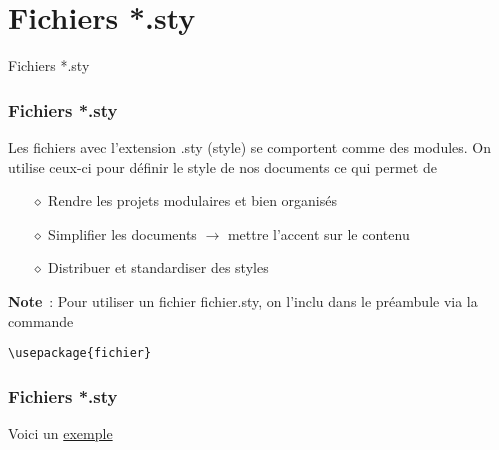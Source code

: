 
\section{Fichiers *.sty}

\begin{frame}
    \vfill
    \begin{center}
        \large
        Fichiers *.sty
    \end{center}
    \vfill
\end{frame}

\begin{frame}[fragile]
    \frametitle{Fichiers *.sty}
    Les fichiers avec l'extension \textcolor{vibrant_green}{.sty (style)} se comportent comme des modules.
    On utilise ceux-ci pour définir le style de nos documents ce qui permet de
    \vspace{0.3cm}
    \pause
    \begin{itemize}
        \item[$\diamond$] Rendre les projets modulaires et bien organisés
        \pause
        \item[$\diamond$] Simplifier les documents $\to$ mettre l'accent sur le contenu
        \pause
        \item[$\diamond$] Distribuer et standardiser des styles
    \end{itemize}
    \vfill
    \pause
    \begin{mybrownbox}
        \textbf{Note}~: Pour utiliser un fichier \textcolor{vibrant_green}{fichier.sty}, on l'inclu
        dans le préambule via la commande
        \begin{lstlisting}[xleftmargin=0mm]
            \usepackage{fichier}
        \end{lstlisting}
    \end{mybrownbox}
\end{frame}

\begin{frame}
    \frametitle{Fichiers *.sty}
    \vfill
    \begin{center}
        \large
        Voici un \href{https://github.com/BCarnaval/UniTeX/blob/main/Classic/style.sty}{\textcolor{lila_links}{exemple}}
    \end{center}
    \vfill
\end{frame}

